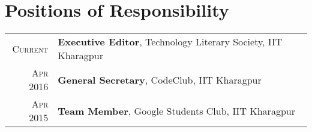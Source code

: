 \documentclass[a4paper,10pt]{extarticle} %
\begin{document}

\section{Positions of Responsibility}

\begin{tabular}{r|p{15cm}}
\textsc{Current} & \textbf{Executive Editor}, Technology Literary Society, IIT Kharagpur \\
\textsc{Apr 2016} & \textbf{General Secretary}, CodeClub, IIT Kharagpur \\
\textsc{Apr 2015} & \textbf{Team Member}, Google Students Club, IIT Kharagpur \\
\end{tabular}

\end{document}
